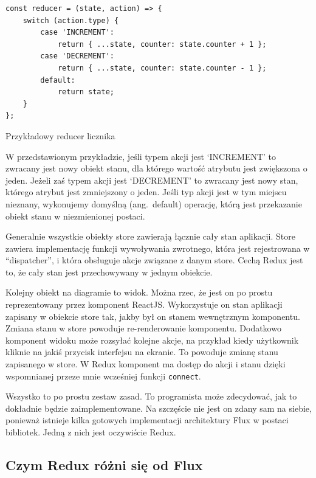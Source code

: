 \begin{listing}
\begin{verbatim}
const reducer = (state, action) => {
    switch (action.type) {
        case 'INCREMENT':
            return { ...state, counter: state.counter + 1 };
        case 'DECREMENT':
            return { ...state, counter: state.counter - 1 };
        default:
            return state;
    }
};
\end{verbatim}
\caption{Przykładowy reducer licznika} \label{listing:reducer}
\end{listing}

W przedstawionym przykładzie, jeśli typem akcji jest `INCREMENT' to zwracany jest nowy obiekt stanu,
dla którego wartość atrybutu  jest zwiększona o jeden.
Jeżeli zaś typem akcji jest `DECREMENT' to zwracany jest nowy stan, którego atrybut  jest zmniejszony o jeden.
Jeśli typ akcji jest w tym miejscu nieznany, wykonujemy domyślną (ang.\ default) operację, którą jest
przekazanie obiekt stanu w niezmienionej postaci.

Generalnie wszystkie obiekty store zawierają łącznie cały stan aplikacji.
Store zawiera implementację funkcji wywoływania zwrotnego,
która jest rejestrowana w ``dispatcher'', i która obsługuje akcje związane z danym store.
Cechą Redux jest to, że cały stan jest przechowywany w jednym obiekcie.

Kolejny obiekt na diagramie to widok.
Można rzec, że jest on po prostu reprezentowany przez komponent ReactJS\@.
Wykorzystuje on stan aplikacji zapisany w obiekcie store tak, jakby był on stanem wewnętrznym komponentu.
Zmiana stanu w store powoduje re-renderowanie komponentu.
Dodatkowo komponent widoku może rozsyłać kolejne akcje, na przykład kiedy użytkownik
kliknie na jakiś przycisk interfejsu na ekranie.
To powoduje zmianę stanu zapisanego w store.
W Redux komponent ma dostęp do akcji i stanu dzięki wspomnianej przeze mnie wcześniej funkcji \texttt{connect}.

Wszystko to po prostu zestaw zasad.
To programista może zdecydować, jak to dokładnie będzie zaimplementowane.
Na szczęście nie jest on zdany sam na siebie, ponieważ istnieje kilka gotowych
implementacji architektury Flux w postaci bibliotek.
Jedną z nich jest oczywiście Redux.
~\cite{www_nafrontendzie}

\subsection{Czym Redux różni się od Flux}

